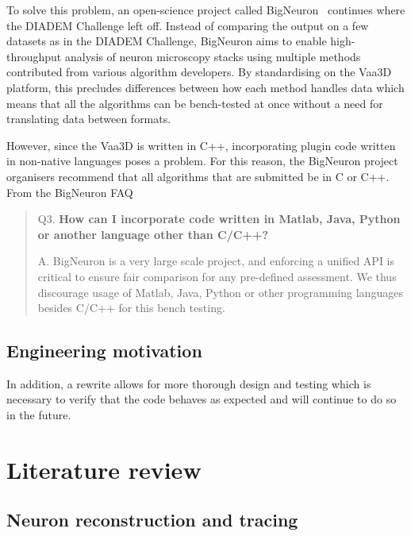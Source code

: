 To solve this problem, an open-science project called
BigNeuron~\autocite{BigNeuron:Peng:2015,DIADEM2BigNeuron:Peng:2015}
continues where the DIADEM Challenge left off. Instead of
comparing the output on a few datasets as in the DIADEM Challenge,
BigNeuron aims to enable high-throughput analysis of neuron
microscopy stacks using multiple methods contributed from various
algorithm developers. By standardising on the Vaa3D platform, this
precludes differences between how each method handles data which
means that all the algorithms can be bench-tested at once without
a need for translating data between formats.

However, since the Vaa3D is written in C++, incorporating plugin
code written in non-native languages poses a problem. For this
reason, the BigNeuron project organisers recommend that all
algorithms that are submitted be in C or C++. From the BigNeuron
FAQ~\autocite{BigNeuron:FAQ:2015}
\begin{quote}
	\begin{fancyquote}
		{Q3. \bfseries How can I incorporate code written in Matlab, Java, Python or another language other than C/C++?}

		A. BigNeuron is a very large scale project, and enforcing a
		unified API is critical to ensure fair comparison for any pre-defined
		assessment. We thus discourage usage of Matlab, Java, Python or other
		programming languages besides C/C++ for this bench
		testing.
	\end{fancyquote}
\end{quote}

\subsection{Engineering motivation}

In addition, a rewrite allows for more thorough
design and testing which is necessary to verify that the code
behaves as expected and will continue to do so in the future.

\section{Literature review}

\subsection{Neuron reconstruction and tracing}\label{subsec:neuron-tracing}

